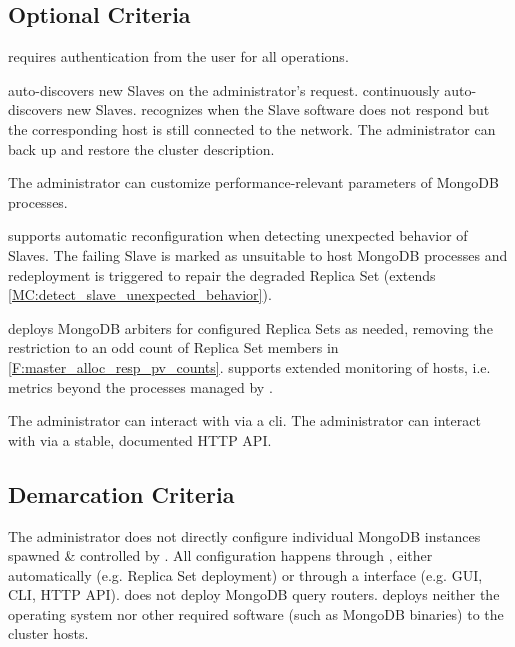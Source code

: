 \subsection{Optional Criteria}\label{OptionalCriteria}
\begin{description}
	
	 \mamid requires authentication from the user for all operations. 
	
	 \mamid auto-discovers new Slaves on the administrator's request. \notdone
	 \mamid continuously auto-discovers new Slaves. \notdone
	 \mamid recognizes when the Slave software does not respond but the corresponding host is still 
	connected to the network.  \notdone
	 The administrator can back up and restore the cluster description. 
	
	 The administrator can customize performance-relevant parameters of MongoDB 
	processes. \notdone
	
	 \mamid supports automatic reconfiguration when detecting unexpected behavior of Slaves. The failing 
	Slave is marked as unsuitable to host MongoDB processes and redeployment is triggered to repair the degraded Replica 
	Set (extends \ref{MC:detect_slave_unexpected_behavior}). \notdone
	
	 \mamid deploys MongoDB arbiters for configured Replica Sets as needed, removing the 
	restriction to an odd count of Replica Set members in \ref{F:master_alloc_resp_pv_counts}.  \notdone
	 \mamid supports extended monitoring of hosts, i.e. metrics beyond the processes managed by \mamid.  
	\notdone
	
	 The administrator can interact with \mamid via a cli.  \notdone
	 The administrator can interact with \mamid via a stable, documented HTTP API.  \done
\end{description}

\subsection{Demarcation Criteria}
\begin{description}
	 The administrator does not directly configure individual MongoDB instances spawned \& controlled by \mamid. 
	All configuration happens through \mamid, either automatically (e.g. Replica Set deployment) or through a \mamid interface (e.g. 
	GUI, CLI, HTTP API). 
	 \mamid does not deploy MongoDB query routers.  \done
	 \mamid deploys neither the operating system nor other required software (such as MongoDB binaries) to the 
	cluster hosts.  \done
\end{description}